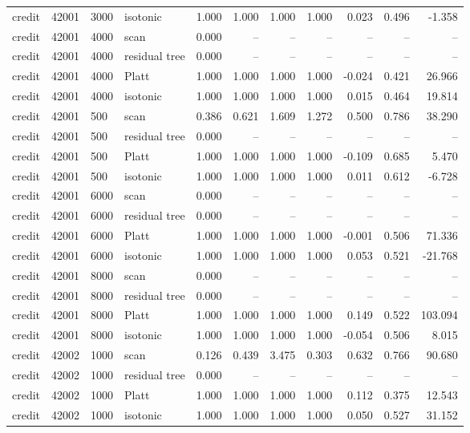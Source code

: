 \begin{tabular}{lrllrrrrrrr}
credit & 42001 & 3000 & isotonic & 1.000 & 1.000 & 1.000 & 1.000 & 0.023 & 0.496 & -1.358 \\
credit & 42001 & 4000 & scan & 0.000 & -- & -- & -- & -- & -- & -- \\
credit & 42001 & 4000 & residual tree & 0.000 & -- & -- & -- & -- & -- & -- \\
credit & 42001 & 4000 & Platt & 1.000 & 1.000 & 1.000 & 1.000 & -0.024 & 0.421 & 26.966 \\
credit & 42001 & 4000 & isotonic & 1.000 & 1.000 & 1.000 & 1.000 & 0.015 & 0.464 & 19.814 \\
credit & 42001 & 500 & scan & 0.386 & 0.621 & 1.609 & 1.272 & 0.500 & 0.786 & 38.290 \\
credit & 42001 & 500 & residual tree & 0.000 & -- & -- & -- & -- & -- & -- \\
credit & 42001 & 500 & Platt & 1.000 & 1.000 & 1.000 & 1.000 & -0.109 & 0.685 & 5.470 \\
credit & 42001 & 500 & isotonic & 1.000 & 1.000 & 1.000 & 1.000 & 0.011 & 0.612 & -6.728 \\
credit & 42001 & 6000 & scan & 0.000 & -- & -- & -- & -- & -- & -- \\
credit & 42001 & 6000 & residual tree & 0.000 & -- & -- & -- & -- & -- & -- \\
credit & 42001 & 6000 & Platt & 1.000 & 1.000 & 1.000 & 1.000 & -0.001 & 0.506 & 71.336 \\
credit & 42001 & 6000 & isotonic & 1.000 & 1.000 & 1.000 & 1.000 & 0.053 & 0.521 & -21.768 \\
credit & 42001 & 8000 & scan & 0.000 & -- & -- & -- & -- & -- & -- \\
credit & 42001 & 8000 & residual tree & 0.000 & -- & -- & -- & -- & -- & -- \\
credit & 42001 & 8000 & Platt & 1.000 & 1.000 & 1.000 & 1.000 & 0.149 & 0.522 & 103.094 \\
credit & 42001 & 8000 & isotonic & 1.000 & 1.000 & 1.000 & 1.000 & -0.054 & 0.506 & 8.015 \\
credit & 42002 & 1000 & scan & 0.126 & 0.439 & 3.475 & 0.303 & 0.632 & 0.766 & 90.680 \\
credit & 42002 & 1000 & residual tree & 0.000 & -- & -- & -- & -- & -- & -- \\
credit & 42002 & 1000 & Platt & 1.000 & 1.000 & 1.000 & 1.000 & 0.112 & 0.375 & 12.543 \\
credit & 42002 & 1000 & isotonic & 1.000 & 1.000 & 1.000 & 1.000 & 0.050 & 0.527 & 31.152 \\

\end{tabular}
